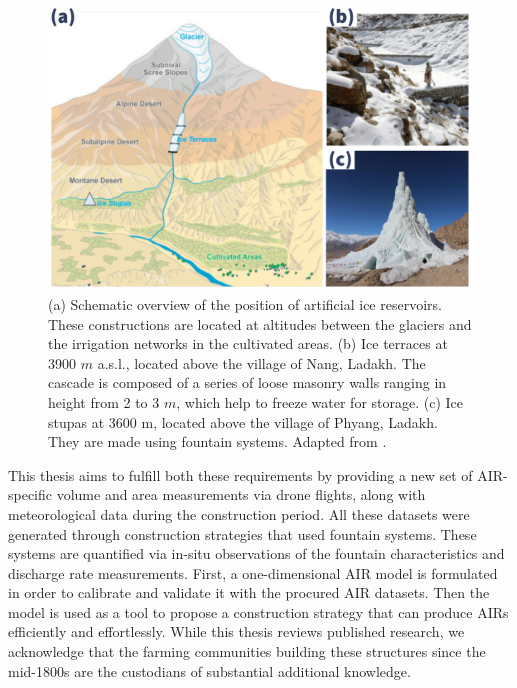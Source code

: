 \begin{figure}[t]
	\centering
	\includegraphics[width=\textwidth]{figs/AIR_forms.jpg}

	\caption{ (a) Schematic overview of the position of artificial ice reservoirs. These constructions are located at
		altitudes between the glaciers and the irrigation networks in the cultivated areas. (b) Ice terraces at 3900
		$m$ \ac{a.s.l.}, located above the village of Nang, Ladakh. The cascade is composed of a series of loose masonry walls
		ranging in height from 2 to 3 $m$, which help to freeze water for storage. (c) Ice stupas at 3600 m, located
		above the village of Phyang, Ladakh. They are made using fountain systems. Adapted from \cite{nusserLocalKnowledgeGlobal2016}. }

	\label{fig:AIRforms}
\end{figure}

This thesis aims to fulfill both these requirements by providing a new set of AIR-specific volume and area
measurements via drone flights, along with meteorological data during the construction period. All these
datasets were generated through construction strategies that used fountain systems. These systems are quantified
via in-situ observations of the fountain characteristics and discharge rate measurements. First, a
one-dimensional AIR model is formulated in order to calibrate and validate it with the procured AIR datasets.
Then the model is used as a tool to propose a construction strategy that can produce \ac{AIRs} efficiently and
effortlessly. While this thesis reviews published research, we acknowledge that the farming communities building
these structures since the mid-1800s are the custodians of substantial additional knowledge.


